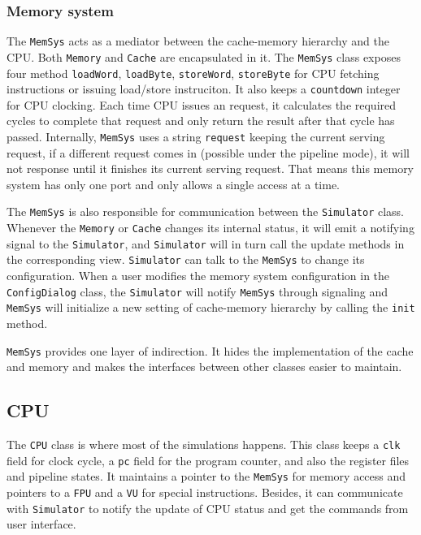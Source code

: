 \documentclass{sig-alternate}
\begin{document}
\subsubsection{Memory system}
The \texttt{MemSys} acts as a mediator between the cache-memory hierarchy and the CPU. Both \texttt{Memory} and \texttt{Cache} are encapsulated in it. The \texttt{MemSys} class exposes four method \texttt{loadWord}, \texttt{loadByte}, \texttt{storeWord}, \texttt{storeByte} for CPU fetching instructions or issuing load/store instruciton. It also keeps a \texttt{countdown} integer for CPU clocking. Each time CPU issues an request, it calculates the required cycles to complete that request and only return the result after that cycle has passed. Internally, \texttt{MemSys} uses a string \texttt{request} keeping the current serving request, if a different request comes in (possible under the pipeline mode), it will not response until it finishes its current serving request. That means this memory system has only one port and only allows a single access at a time. 

The \texttt{MemSys} is also responsible for communication between the \texttt{Simulator} class. Whenever the \texttt{Memory} or \texttt{Cache} changes its internal status, it will emit a notifying signal to the \texttt{Simulator}, and \texttt{Simulator} will in turn call the update methods in the corresponding view. \texttt{Simulator} can talk to the \texttt{MemSys} to change its configuration. When a user modifies the memory system configuration in the \texttt{ConfigDialog} class, the \texttt{Simulator} will notify \texttt{MemSys} through signaling and \texttt{MemSys} will initialize a new setting of cache-memory hierarchy by calling the \texttt{init} method.

\texttt{MemSys} provides one layer of indirection. It hides the implementation of the cache and memory and makes the interfaces between other classes easier to maintain. 

\subsection{CPU}
The \texttt{CPU} class is where most of the simulations happens. This class keeps a \texttt{clk} field for clock cycle, a \texttt{pc} field for the program counter, and also the register files and pipeline states. It maintains a pointer to the \texttt{MemSys} for memory access and pointers to a \texttt{FPU} and a \texttt{VU} for special instructions. Besides, it can communicate with \texttt{Simulator} to notify the update of CPU status and get the commands from user interface.
\end{document}
